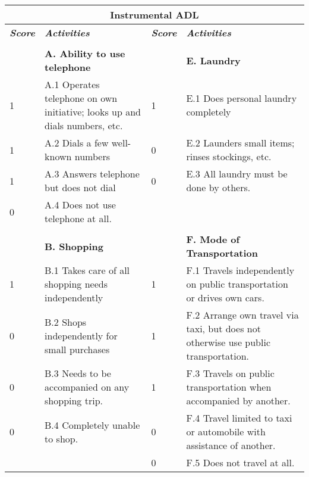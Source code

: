 \documentclass[main.tex]{subfiles}
\begin{document}
\begin{center}
\begin{longtable}{ |p{0.8cm}p{6.8cm}|p{0.8cm}p{6.8cm}|  }
 \hline
 \multicolumn{4}{|c|}{Instrumental ADL} \\
 \hline
 \textit{\textbf{Score}} & \textit{\textbf{Activities}} & \textit{\textbf{Score}} & \textit{\textbf{Activities}}\\
 \hline
 \vspace{0.15cm} & & &\\
 
  & \textbf{A. Ability to use telephone}  & & \textbf{E. Laundry}  \\
  
 1 & A.1 Operates telephone on own initiative; looks up and dials numbers, etc. & 1  & E.1 Does personal laundry completely \\
 
 1 & A.2 Dials a few well-known numbers & 0 &  E.2 Launders small items; rinses stockings, etc.\\
 
 1    & A.3 Answers telephone but does not dial & 0 & E.3 All laundry must be done by others.\\
 
 0 & A.4 Does not use telephone at all. & & \\
 
 \vspace{0.15cm} & & &\\

 & \textbf{B. Shopping} & & \textbf{F. Mode of Transportation} \\
 
 1 & B.1 Takes care of all shopping needs independently & 1 & F.1 Travels independently on public transportation or drives own cars. \\
 
 0 & B.2 Shops independently for small purchases & 1 & F.2 Arrange own travel via taxi, but does not otherwise use public transportation.\\
 
 0 & B.3 Needs to be accompanied on any shopping trip. & 1 & F.3 Travels on public transportation when accompanied by another.\\
 
 0 & B.4 Completely unable to shop. & 0 & F.4 Travel limited to taxi or automobile with  assistance of another.\\
 
 & & 0 & F.5 Does not travel at all.\\
 

\end{longtable}
\end{center}
\end{document}
